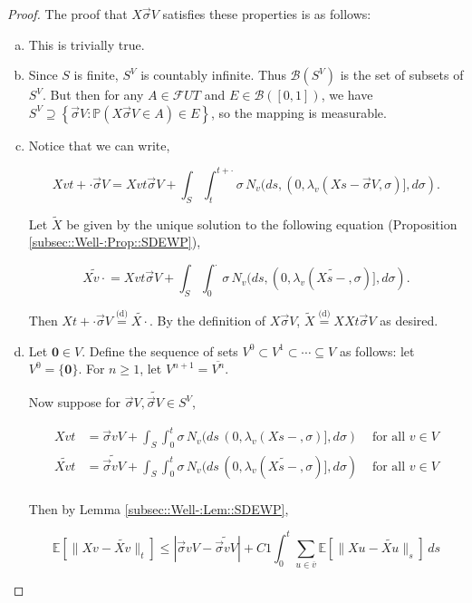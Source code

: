 \documentclass[12pt]{article}
\newcommand{\mb}{\mathbb}
\newcommand{\mc}{\mathcal}
\newcommand{\ms}{\mathscr}
\newcommand{\ov}{\overline}
\newcommand{\te}{\text}
\newcommand{\ind}{\hspace{24pt}}
\newcommand{\pr}{\mb{P}}							%
\newcommand{\ex}[1]{\mb{E}\left[#1\right]}			%
\newcommand{\deq}{\overset{\text{(d)}}{=}}			%
\renewcommand{\root}{\mathbf{0}}				%
\renewcommand{\v}{v}							%
\newcommand{\vv}{u}								%
\renewcommand{\U}{U}							%
\renewcommand{\S}{S}							%
\newcommand{\s}{\sigma}							%
\newcommand{\sv}{\vec{\s}}						%
\newcommand{\T}{T}								%
\renewcommand{\t}{t}							%
\renewcommand{\tt}{s}							%
\newcommand{\F}{\mc{F}}							%
\newcommand{\X}{X}								%
\newcommand{\cl}{\ov}							%
\newcommand{\const}{C}							%
\newcommand{\sln}[1]{^{#1}}						%
\newcommand{\poiss}[1]{N_{#1}}						%
\newcommand{\XState}[1]{\S^{#1}}				%
\newcommand{\rate}[1]{\lambda_{#1}}					%
\newcommand{\alt}{\widetilde}						%
\begin{document}
\begin{proof}
The proof that \(\X{}{}{\sv{}{ V}}\) satisfies these properties is as follows:

\begin{enumerate}[(a)]
\item This is trivially true.

\item Since \(\S\) is finite, \(\S^ V\) is countably infinite. Thus \(\ms{B}(\S^ V)\) is the set of subsets of \(\S^ V\). But then for any \(A \in \F{\U}{\T}\) and \(E \in \ms{B}([0,1])\), we have \(\S^ V \supseteq \left\{\sv{}{ V}: \pr\left(\X{}{}{\sv{}{ V}} \in A\right) \in E\right\}\), so the mapping is measurable.

\item Notice that we can write,

\[\X{\v}{\t+\cdot}{\sv{}{ V}} = \X{\v}{\t}{\sv{}{ V}} + \int_\S\int_\t^{\t+\cdot} \s\,\poiss{\v}(d\tt,(0,\rate{\v}(\X{}{\tt-}{\sv{}{ V}},\s)],d\s).\]

Let \(\alt{\X{}{}}\) be given by the unique solution to the following equation (Proposition \ref{subsec::Well-:Prop::SDEWP}),

\[\alt{\X{\v}{\cdot}} = \X{\v}{\t}{\sv{}{ V}} + \int_\S \int_0^\cdot \s\,\poiss{\v}(d\tt,(0,\rate{\v}(\alt{\X{}{\tt-}},\s)],d\s).\]

Then \(\X{}{\t+\cdot}{\sv{}{ V}} \deq \alt{\X{}{\cdot}}\). By the definition of \(\X{}{}{\sv{}{ V}}\), \(\alt{\X{}{}} \deq \X{}{}{\X{}{\t}{\sv{}{ V}}}\) as desired.

\item Let \(\root \in  V\). Define the sequence of sets \( V\sln{0}\subset  V\sln{1}\subset \cdots \subseteq  V\) as follows: let \( V\sln{0} = \{\root\}\). For \(n \geq 1\), let \( V\sln{n+1} = \cl{ V\sln{n}}\).

\ind Now suppose for \(\sv{}{ V},\alt{\sv{}{ V}}\in \S^ V\),

\begin{align*}
\X{\v}{\t} &= \sv{\v}{ V} + \int_\S\int_0^\t \s\,\poiss{\v}(d\tt\,(0,\rate{\v}(\X{}{\tt-},\s)],d\s)&\te{ for all } \v \in  V\\
\alt{\X{\v}{\t}} &= \alt{\sv{\v}{ V}} + \int_\S\int_0^\t \s\,\poiss{\v}(d\tt\,(0,\rate{\v}(\alt{\X{}{\tt-}},\s)],d\s)&\te{ for all } \v \in  V\\
\end{align*}

Then by Lemma \ref{subsec::Well-:Lem::SDEWP},

\[\ex{\|\X{\v}{} - \alt{\X{\v}{}}\|_\t} \leq |\sv{\v}{ V} - \alt{\sv{\v}{ V}}| + \const{1}\int_0^\t \sum_{\vv\in \cl{\v}} \ex{\|\X{\vv}{} - \alt{\X{\vv}{}}\|_\tt}\,d\tt\]


\end{enumerate}
\end{proof}
\end{document}
